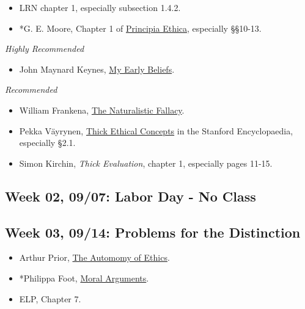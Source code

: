 \documentclass[
]{article}
\providecommand{\tightlist}{%
  \setlength{\itemsep}{0pt}\setlength{\parskip}{0pt}}
\begin{document}
\begin{itemize}
\tightlist
\item
  LRN chapter 1, especially subsection 1.4.2.
\item
  *G. E. Moore, Chapter 1 of
  \href{https://brian.weatherson.org/gutenberg-files/principia_ethica/}{Principia
  Ethica}, especially §§10-13.
\end{itemize}

\emph{Highly Recommended}

\begin{itemize}
\tightlist
\item
  John Maynard Keynes, \href{http://brian.weatherson.org/meb.html}{My
  Early Beliefs}.
\end{itemize}

\emph{Recommended}

\begin{itemize}
\tightlist
\item
  William Frankena,
  \href{https://www.jstor.org/stable/2250706?seq=1\#metadata_info_tab_contents}{The
  Naturalistic Fallacy}.
\item
  Pekka Väyrynen,
  \href{https://plato.stanford.edu/entries/thick-ethical-concepts/}{Thick
  Ethical Concepts} in the Stanford Encyclopaedia, especially §2.1.
\item
  Simon Kirchin, \emph{Thick Evaluation}, chapter 1, especially pages
  11-15.
\end{itemize}

\hypertarget{week-02-0907-labor-day---no-class}{%
\subsection{Week 02, 09/07: Labor Day - No
Class}\label{week-02-0907-labor-day---no-class}}

\hypertarget{week-03-0914-problems-for-the-distinction}{%
\subsection{Week 03, 09/14: Problems for the
Distinction}\label{week-03-0914-problems-for-the-distinction}}

\begin{itemize}
\tightlist
\item
  Arthur Prior,
  \href{https://www.tandfonline.com/doi/abs/10.1080/00048406085200221}{The
  Automomy of Ethics}.
\item
  *Philippa Foot, \href{https://www.jstor.org/stable/2251201}{Moral
  Arguments}.
\item
  ELP, Chapter 7.
\end{itemize}
\end{document}
